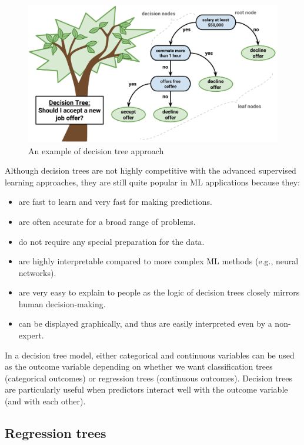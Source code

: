 \documentclass[]{book}
\providecommand{\tightlist}{%
  \setlength{\itemsep}{0pt}\setlength{\parskip}{0pt}}
\begin{document}
\begin{figure}
\includegraphics[width=1\linewidth]{images/decisiontree} \caption{An example of decision tree approach}\label{fig:fig6-1}
\end{figure}

Although decision trees are not highly competitive with the advanced supervised learning approaches, they are still quite popular in ML applications because they:

\begin{itemize}
\tightlist
\item
  are fast to learn and very fast for making predictions.
\item
  are often accurate for a broad range of problems.
\item
  do not require any special preparation for the data.
\item
  are highly interpretable compared to more complex ML methods (e.g., neural networks).
\item
  are very easy to explain to people as the logic of decision trees closely mirrors human decision-making.
\item
  can be displayed graphically, and thus are easily interpreted even by a non-expert.
\end{itemize}

In a decision tree model, either categorical and continuous variables can be used as the outcome variable depending on whether we want classification trees (categorical outcomes) or regression trees (continuous outcomes). Decision trees are particularly useful when predictors interact well with the outcome variable (and with each other).

\hypertarget{regression-trees}{%
\subsection{Regression trees}\label{regression-trees}}
\end{document}
